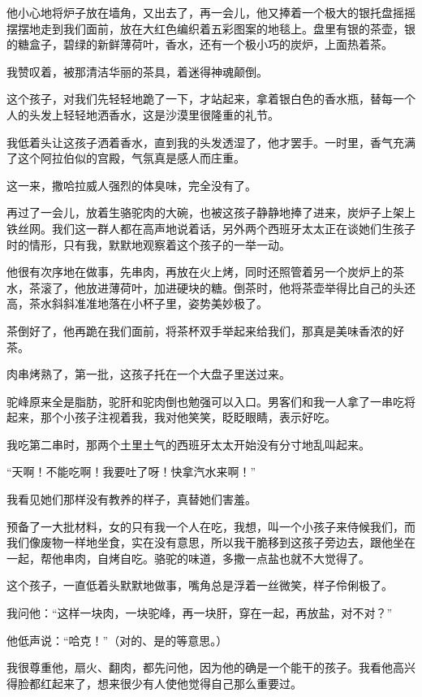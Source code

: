 \par 他小心地将炉子放在墙角，又出去了，再一会儿，他又捧着一个极大的银托盘摇摇摆摆地走到我们面前，放在大红色编织着五彩图案的地毯上。盘里有银的茶壶，银的糖盒子，碧绿的新鲜薄荷叶，香水，还有一个极小巧的炭炉，上面热着茶。
\par 我赞叹着，被那清洁华丽的茶具，着迷得神魂颠倒。
\par 这个孩子，对我们先轻轻地跪了一下，才站起来，拿着银白色的香水瓶，替每一个人的头发上轻轻地洒香水，这是沙漠里很隆重的礼节。
\par 我低着头让这孩子洒着香水，直到我的头发透湿了，他才罢手。一时里，香气充满了这个阿拉伯似的宫殿，气氛真是感人而庄重。
\par 这一来，撒哈拉威人强烈的体臭味，完全没有了。
\par 再过了一会儿，放着生骆驼肉的大碗，也被这孩子静静地捧了进来，炭炉子上架上铁丝网。我们这一群人都在高声地说着话，另外两个西班牙太太正在谈她们生孩子时的情形，只有我，默默地观察着这个孩子的一举一动。
\par 他很有次序地在做事，先串肉，再放在火上烤，同时还照管着另一个炭炉上的茶水，茶滚了，他放进薄荷叶，加进硬块的糖。倒茶时，他将茶壶举得比自己的头还高，茶水斜斜准准地落在小杯子里，姿势美妙极了。
\par 茶倒好了，他再跪在我们面前，将茶杯双手举起来给我们，那真是美味香浓的好茶。
\par 肉串烤熟了，第一批，这孩子托在一个大盘子里送过来。
\par 驼峰原来全是脂肪，驼肝和驼肉倒也勉强可以入口。男客们和我一人拿了一串吃将起来，那个小孩子注视着我，我对他笑笑，眨眨眼睛，表示好吃。
\par 我吃第二串时，那两个土里土气的西班牙太太开始没有分寸地乱叫起来。
\par “天啊！不能吃啊！我要吐了呀！快拿汽水来啊！”
\par 我看见她们那样没有教养的样子，真替她们害羞。
\par 预备了一大批材料，女的只有我一个人在吃，我想，叫一个小孩子来侍候我们，而我们像废物一样地坐食，实在没有意思，所以我干脆移到这孩子旁边去，跟他坐在一起，帮他串肉，自烤自吃。骆驼的味道，多撒一点盐也就不大觉得了。
\par 这个孩子，一直低着头默默地做事，嘴角总是浮着一丝微笑，样子伶俐极了。
\par 我问他：“这样一块肉，一块驼峰，再一块肝，穿在一起，再放盐，对不对？”
\par 他低声说：“哈克！”（对的、是的等意思。）
\par 我很尊重他，扇火、翻肉，都先问他，因为他的确是一个能干的孩子。我看他高兴得脸都红起来了，想来很少有人使他觉得自己那么重要过。
